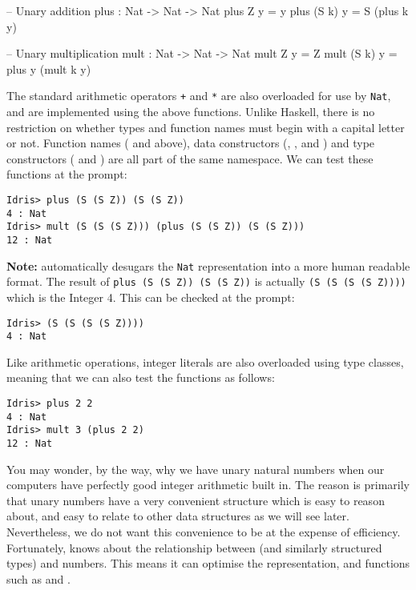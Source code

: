 \begin{code}
-- Unary addition
plus : Nat -> Nat -> Nat
plus Z     y = y
plus (S k) y = S (plus k y)

-- Unary multiplication
mult : Nat -> Nat -> Nat
mult Z     y = Z
mult (S k) y = plus y (mult k y)
\end{code}

\noindent
The standard arithmetic operators \texttt{+} and \texttt{*} are also overloaded for use by \texttt{Nat}, and are implemented using the above functions.
Unlike Haskell, there is no restriction on whether types and function names must begin with a capital letter or not.
Function names ( and  above), data constructors (, ,  and \tDC{::}) and type constructors ( and ) are all part of the same namespace.
We can test these functions at the \Idris{} prompt:

\begin{lstlisting}[style=stdout]
Idris> plus (S (S Z)) (S (S Z))
4 : Nat
Idris> mult (S (S (S Z))) (plus (S (S Z)) (S (S Z)))
12 : Nat
\end{lstlisting}

\noindent
\textbf{Note:} \Idris{} automatically desugars the \texttt{Nat} representation into a more human readable format. The result of \verb!plus (S (S Z)) (S (S Z))! is actually \verb!(S (S (S (S Z))))! which is the Integer 4. This can be checked at the \Idris{} prompt:

\begin{lstlisting}[style=stdout]
Idris> (S (S (S (S Z))))
4 : Nat
\end{lstlisting}

\noindent
Like arithmetic operations, integer literals are also overloaded using type classes, meaning that we can also test the functions as follows:

\begin{lstlisting}[style=stdout]
Idris> plus 2 2
4 : Nat
Idris> mult 3 (plus 2 2)
12 : Nat
\end{lstlisting}

\noindent
You may wonder, by the way, why we have unary natural numbers when our computers have perfectly good integer arithmetic built in.
The reason is primarily that unary numbers have a very convenient structure which is easy to reason about, and easy to relate to other data structures as we will see later.
Nevertheless, we do not want this convenience to be at the expense of efficiency.
Fortunately, \Idris{} knows about the relationship between  (and similarly structured types) and numbers. This means it can optimise the representation, and functions such as  and .

